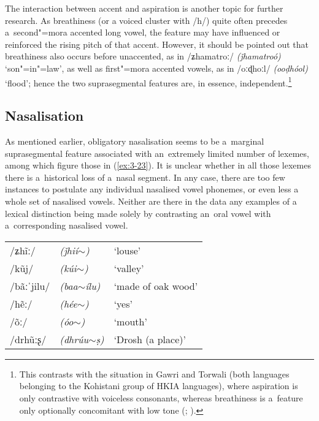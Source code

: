 The interaction between accent and aspiration is another topic for further research. As breathiness (or a voiced cluster with /h/) quite often precedes a~second"=mora accented long vowel, the feature may have influenced or reinforced the rising pitch of that accent. However, it should be pointed out that breathiness also occurs before unaccented, as in /ʑhamatroː/ \textit{(ǰhamatroó)} `son"=in"=law', as well as first"=mora accented vowels, as in /oːɖhoːl/ \textit{(ooḍhóol)} `flood'; hence the two suprasegmental features are, in essence, independent.\footnote{This contrasts with the situation in Gawri and Torwali (both languages belonging to the Kohistani group of HKIA languages), where aspiration is only contrastive with voiceless consonants, whereas breathiness is a~feature only optionally concomitant with low tone (\citealt[92]{baart1999b}; \citealt[36--37]{lunsford2001}). } 


\subsection{Nasalisation}
\label{subsec:3-4-2}


As mentioned earlier, obligatory nasalisation seems to be a~marginal suprasegmental feature associated with an~extremely limited number of lexemes, among which figure those in (\ref{ex:3-23}). It is unclear whether in all those lexemes there is a~historical loss of a~nasal segment. In any case, there are too few instances to postulate any individual nasalised vowel phonemes, or even less a whole set of nasalised vowels. Neither are there in the data any examples of a lexical distinction being made solely by contrasting an~oral vowel with a~corresponding nasalised vowel. 


\begin{exe}
\extab
\label{ex:3-23}
\begin{tabularx}{\textwidth}{ l l l }
/ʑh\~{i}ː/ &
\textit{(ǰhií$\sim$) } &
`louse'\\
/kũj/ &
\textit{(kúi$\sim$)} &
`valley'\\
/bãːˈjilu/ &
\textit{(baa$\sim$ílu)} &
`made of oak wood'\\
/hẽː/ &
\textit{(hée$\sim$)} &
`yes'\\
/õː/ &
\textit{(óo$\sim$)} &
`mouth'\\
/drhũːʂ/ &
\textit{(dhrúu$\sim$ṣ)} &
`Drosh (a place)'\\
\end{tabularx}
\end{exe}

